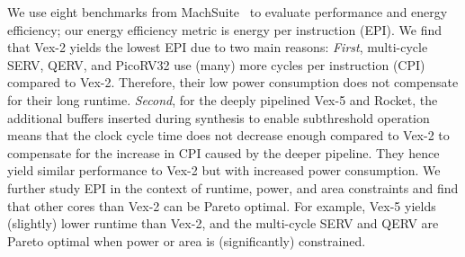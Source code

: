 We use eight benchmarks from MachSuite~\cite{machsuite:IISWC2014} to evaluate performance and energy efficiency; our energy efficiency metric is energy per instruction (EPI).
We find that Vex-2 yields the lowest EPI due to two main reasons:
\textit{First}, multi-cycle SERV, QERV, and PicoRV32 use (many) more cycles per instruction (CPI) compared to Vex-2.
Therefore, their low power consumption does not compensate for their long runtime.
\textit{Second}, for the deeply pipelined Vex-5 and Rocket, the additional buffers inserted during synthesis to enable subthreshold operation means that the clock cycle time does not decrease enough compared to Vex-2 to compensate for the increase in CPI caused by the deeper pipeline.
They hence yield similar performance to Vex-2 but with increased power consumption.
We further study EPI in the context of runtime, power, and area constraints and find that other cores than Vex-2 can be Pareto optimal.
For example, Vex-5 yields (slightly) lower runtime than Vex-2, and the multi-cycle SERV and QERV are Pareto optimal when power or area is (significantly) constrained.
